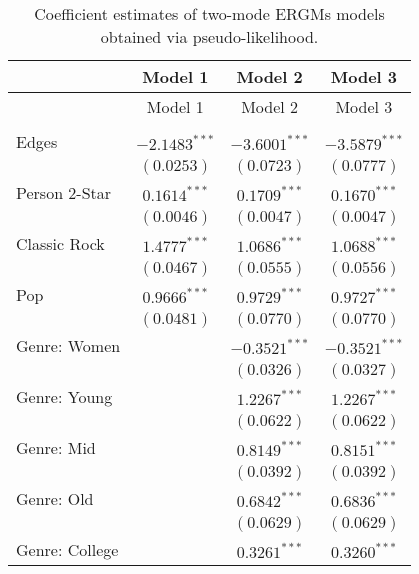 
\begin{center}
\begin{longtable}{l c c c}
\caption{Coefficient estimates of two-mode ERGMs models obtained via pseudo-likelihood.}
\label{tab:reg1}\\
\toprule
 & Model 1 & Model 2 & Model 3 \\
\midrule
\endfirsthead
\toprule
 & Model 1 & Model 2 & Model 3 \\
\midrule
\endhead
\bottomrule
\endfoot
\bottomrule
\multicolumn{4}{l}{\scriptsize{$^{***}p<0.001$; $^{**}p<0.01$; $^{*}p<0.05$}}\\
\endlastfoot
Edges                & $-2.1483^{***}$ & $-3.6001^{***}$ & $-3.5879^{***}$ \\
                     & $(0.0253)$      & $(0.0723)$      & $(0.0777)$      \\
Person 2-Star        & $0.1614^{***}$  & $0.1709^{***}$  & $0.1670^{***}$  \\
                     & $(0.0046)$      & $(0.0047)$      & $(0.0047)$      \\
Classic Rock         & $1.4777^{***}$  & $1.0686^{***}$  & $1.0688^{***}$  \\
                     & $(0.0467)$      & $(0.0555)$      & $(0.0556)$      \\
Pop                  & $0.9666^{***}$  & $0.9729^{***}$  & $0.9727^{***}$  \\
                     & $(0.0481)$      & $(0.0770)$      & $(0.0770)$      \\
Genre: Women         &                 & $-0.3521^{***}$ & $-0.3521^{***}$ \\
                     &                 & $(0.0326)$      & $(0.0327)$      \\
Genre: Young         &                 & $1.2267^{***}$  & $1.2267^{***}$  \\
                     &                 & $(0.0622)$      & $(0.0622)$      \\
Genre: Mid           &                 & $0.8149^{***}$  & $0.8151^{***}$  \\
                     &                 & $(0.0392)$      & $(0.0392)$      \\
Genre: Old           &                 & $0.6842^{***}$  & $0.6836^{***}$  \\
                     &                 & $(0.0629)$      & $(0.0629)$      \\
Genre: College       &                 & $0.3261^{***}$  & $0.3260^{***}$  \\

\end{longtable}
\end{center}
